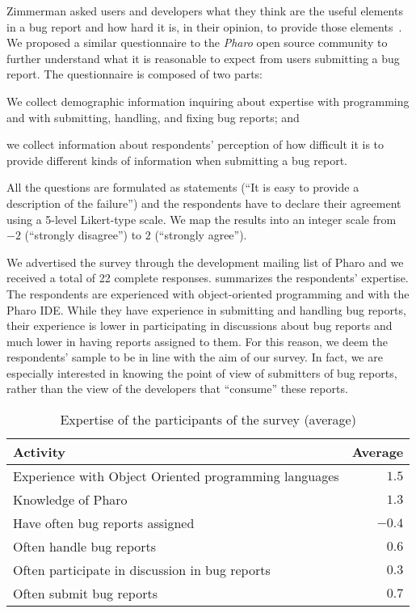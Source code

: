 Zimmerman \etal asked users and developers what they think are the useful elements in a bug report and how hard it is, in their opinion, to provide those elements~\cite{Zimm2010a}.
We proposed a similar questionnaire to the \emph{Pharo} open source community to further understand what it is reasonable to expect from users submitting a bug report.
The questionnaire is composed of two parts: \begin{inparaenum}[(1)]
\item We collect demographic information inquiring about expertise with programming and with submitting, handling, and fixing bug reports; and
\item we collect information about respondents' perception of how difficult it is to provide different kinds of information when submitting a bug report.
\end{inparaenum}
All the questions are formulated as statements (\eg ``It is easy to provide a description of the failure'') and the respondents have to declare their agreement using a 5-level Likert-type scale.
We map the results into an integer scale from $-2$ (\ie ``strongly disagree'') to $2$ (\ie ``strongly agree'').

We advertised the survey through the development mailing list of Pharo and we received a total of 22 complete responses.
 summarizes the respondents' expertise.
The respondents are experienced with object-oriented programming and with the Pharo IDE.
While they have experience in submitting and handling bug reports, their experience is lower in participating in discussions about bug reports and much lower in having reports assigned to them.
For this reason, we deem the respondents' sample to be in line with the aim of our survey.
In fact, we are especially interested in knowing the point of view of submitters of bug reports, rather than the view of the developers that ``consume'' these reports.

\begin{table}[h]
\begin{center}
\caption{Expertise of the participants of the survey (average)}\label{tab:survey}
\begin{tabular}{lr}
\textbf{Activity} & \textbf{Average} \\
\hline
Experience with Object Oriented programming languages & $1.5$ \\
Knowledge of Pharo & $1.3$ \\ \hline
Have often bug reports assigned & $-0.4$ \\
Often handle bug reports & $0.6$ \\
Often participate in discussion in bug reports & $0.3$ \\
Often submit bug reports & $0.7$ \\
\hline
\end{tabular}
\label{tab:survey-expertise}
\end{center}
\end{table}


